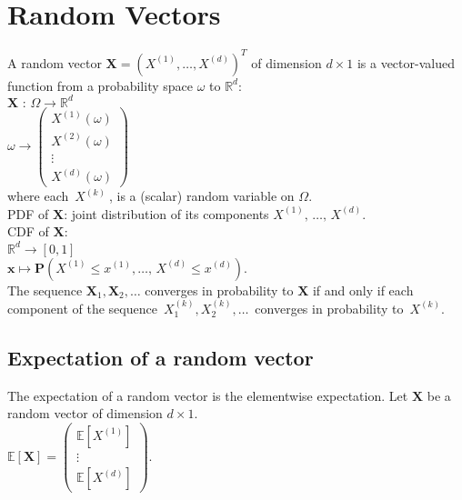 \section{Random Vectors}


A random vector $\mathbf X= \left(X^{(1)},\dots ,X^{(d)}\right)^ T$ of dimension $d \times 1$ is a vector-valued function from a probability space $\omega$ to $\mathbb {R}^ d$:\\

$  \mathbf{X}\, \, :\,  \Omega \longrightarrow   \mathbb {R}^ d$\\

$ \omega  \longrightarrow  \begin{pmatrix}  X^{(1)}(\omega ) \\ X^{(2)}(\omega )\\ \vdots \\ X^{(d)}(\omega )\end{pmatrix}$\\

where each $\, X^{(k)}\ $, is a (scalar) random variable on $\Omega$. \\

PDF of $\mathbf X$: joint distribution of its components $X^{(1)},\, \ldots ,\, X^{(d)}$. \\

CDF of $\mathbf X$:\\

$\mathbb {R}^ d \rightarrow   [0,1]$\\

$ \mathbf{x}  \mapsto   \mathbf{P}(X^{(1)}\leq x^{(1)},\ldots ,\, X^{(d)}\leq x^{(d)}).$\\

The sequence $\mathbf{X}_1, \mathbf{X}_2,\ldots$ converges in probability to $\mathbf{X}$ if and only if each component of the sequence $\, X_1^{(k)},X_2^{(k)},\ldots \,$ converges in probability to $\, X^{(k)}$.


\subsection*{Expectation of a random vector}
The expectation of a random vector is the elementwise expectation. Let $\mathbf X$  be a random vector of dimension $d \times 1$.\\

$   \mathbb E[\mathbf X] =  \begin{pmatrix} \mathbb E[X^{(1)}]\\ \vdots \\ \mathbb E[X^{(d)}]\end{pmatrix}.$\\

